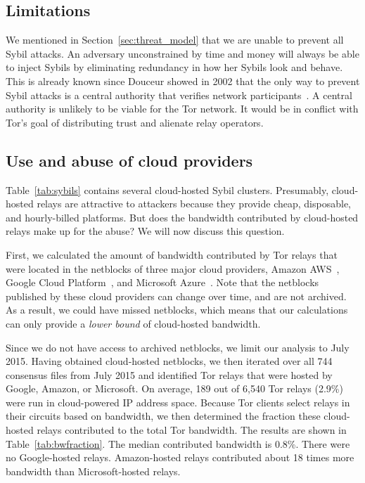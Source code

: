 \subsection{Limitations}
\label{sec:limitations}
We mentioned in Section~\ref{sec:threat_model} that we are unable to prevent all
Sybil attacks.  An adversary unconstrained by time and money will always be able
to inject Sybils by eliminating redundancy in how her Sybils look and behave.
This is already known since Douceur showed in 2002 that the only way to prevent
Sybil attacks is a central authority that verifies network
participants~\cite{Douceur2002a}.  A central authority is unlikely to be viable
for the Tor network.  It would be in conflict with Tor's goal of distributing
trust and alienate relay operators.


\subsection{Use and abuse of cloud providers}
\label{sec:cloud}
Table~\ref{tab:sybils} contains several cloud-hosted Sybil clusters.
Presumably, cloud-hosted relays are attractive to attackers because they
provide cheap, disposable, and hourly-billed platforms.  But does the bandwidth
contributed by cloud-hosted relays make up for the abuse?  We will now discuss
this question.

First, we calculated the amount of bandwidth contributed by Tor relays that
were located in the netblocks of three major cloud providers, Amazon
AWS~\cite{amazonaws}, Google Cloud Platform~\cite{googlecloud}, and Microsoft
Azure~\cite{azure}.  Note that the netblocks published by these cloud providers
can change over time, and are not archived.  As a result, we could have missed
netblocks, which means that our calculations can only provide a \emph{lower
bound} of cloud-hosted bandwidth.

Since we do not have access to archived netblocks, we limit our analysis to
July 2015.  Having obtained cloud-hosted netblocks, we then iterated over all
744 consensus files from July 2015 and identified Tor relays that were hosted
by Google, Amazon, or Microsoft.  On average, 189 out of 6,540 Tor relays
(2.9\%) were run in cloud-powered IP address space.  Because Tor
clients select relays in their circuits based on bandwidth, we then determined
the fraction these cloud-hosted relays contributed to the total Tor bandwidth.
The results are shown in Table~\ref{tab:bwfraction}.  The median contributed
bandwidth is 0.8\%.  There were no Google-hosted relays.  Amazon-hosted relays
contributed about 18 times more bandwidth than Microsoft-hosted relays.

